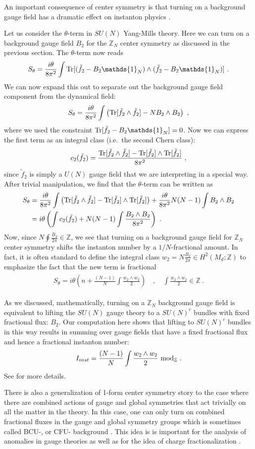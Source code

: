 \documentclass[11pt]{article}
\newcommand{\eq}[1]{\begin{align}\begin{split}#1\end{split}\end{align}}
\newcommand{\twopi}[1]{{\frac{#1}{2\pi}}}
\def\Tr{{\rm Tr}}
\def\IZ{{\mathbb{Z}}}
\begin{document}
An important consequence of center symmetry   is that turning on a background gauge field  has a dramatic effect on instanton physics  \cite{Aharony:2013hda,Gaiotto:2017yup,Cordova:2019uob}. 

Let us consider the $\theta$-term in $SU(N)$ Yang-Mills theory. Here we can turn on a background gauge field $B_2$ for the $\IZ_N$ center symmetry as discussed in the previous section. The $\theta$-term now reads
\eq{
S_\theta=\frac{i\theta}{8\pi^2}\int \Tr[(\tilde{f}_2-B_2\mathds{1}_N)\wedge (\tilde{f}_2-B_2\mathds{1}_N)]~.
}
We can now expand this out to separate out the background gauge field component from the dynamical field:
\eq{
S_\theta=\frac{i \theta}{8\pi^2}\int \left(\Tr[\tilde{f}_2\wedge \tilde{f}_2]-N B_2\wedge B_2\right)~,
}
where we used the constraint $\Tr[\tilde{f}_2-B_2\mathds{1}_N]=0$. Now we can express the first term as an integral class (i.e.~the second Chern class):
\eq{
c_2(\tilde{f}_2)=\frac{\Tr[\tilde{f}_2\wedge \tilde{f}_2]-\Tr[\tilde{f}_2]\wedge \Tr[\tilde{f}_2]}{8\pi^2}~,
}
since $\tilde{f}_2$ is  simply a $U(N)$ gauge field that we are interpreting in a special way.
After trivial manipulation, we find that the $\theta$-term can be written as 
\eq{
S_\theta&=\frac{i \theta}{8\pi^2}\int \left(\Tr[\tilde{f}_2\wedge \tilde{f}_2]-\Tr[\tilde{f}_2]\wedge \Tr[\tilde{f}_2]\right)+\frac{i \theta}{8\pi^2}N(N-1)\int B_2\wedge B_2\\
&=i  \theta\left(\int c_2(\tilde{f}_2)+N(N-1)\int\frac{B_2\wedge B_2}{8\pi^2}\right)~.
}
Now, since $N\oint \twopi{B_2}\in \IZ$, we see that turning on a background gauge field for $\IZ_N$ center symmetry shifts the instanton number by a $1/N$-fractional amount. In fact, it is often standard to define the integral class $w_2= N \frac{B_2}{2\pi}\in H^2(M_d;\IZ)$ to emphasize the fact that the new term is fractional
\eq{
S_\theta =i  \theta\left(n+\frac{(N-1)}{N}\int\frac{w_2\wedge w_2}{2}\right)\quad, \quad \int\frac{w_2\wedge w_2}{2}\in \IZ~.
}

As we discussed, mathematically, turning on a $\IZ_N$ background gauge field is equivalent to lifting the $SU(N)$ gauge theory to a $SU(N)^c$ bundles with fixed fractional flux: $B_2$. Our computation here shows that lifting to $SU(N)^c$ bundles in this way results in  summing over gauge fields that have a fixed fractional flux and hence a fractional instanton number:  
\eq{
I_{inst}=\frac{(N-1)}{N}\int\frac{w_2\wedge w_2}{2}~{\rm mod}_\IZ~.
}
See  \cite{Gaiotto:2014kfa} for more details. 

There is also a generalization of 1-form center symmetry story to the case where there are combined actions of gauge and global symmetries that act trivially on all the matter in the theory. In this case, one can only turn on combined fractional fluxes in the gauge and global symmetry groups which is sometimes called BCU-, or CFU- background 
\cite{Anber:2021iip, Anber:2019nze}. This idea is is important for the analysis of anomalies in gauge theories as well as for the idea of charge fractionalization \cite{Wang:2018qoy,Brennan:2022tyl,Delmastro:2022pfo,Barkeshli:2014cna}. 
\end{document}
